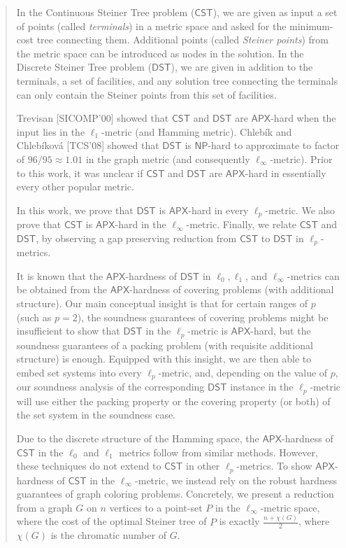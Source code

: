 \documentclass{article}\providecommand{\DeclareRedundantLanguages}[2]{}\usepackage[a4paper,margin=20mm]{geometry}
\newcommand{\1}{\textbf{1}}
\newcommand{\cst}{$\mathsf{CST}$\xspace}
\newcommand{\dst}{$\mathsf{DST}$\xspace}
\newcommand{\np}{$\mathsf{NP}$\xspace}
\newcommand{\apx}{$\mathsf{APX}$\xspace}
\begin{document}
\begin{abstract}
In the Continuous Steiner Tree problem (\cst), we are given as input a set of points (called \emph{terminals}) in a metric space and asked for the minimum-cost tree connecting them. Additional points (called \emph{Steiner points}) from the metric space can be introduced as nodes in the solution. In the Discrete Steiner Tree problem (\dst), we are given in addition to the terminals, a set of facilities, and any solution tree connecting the terminals can only contain the Steiner points from this set of facilities. %

Trevisan [SICOMP'00] showed that \cst and \dst are \apx-hard when the input lies in the $\ell_1$-metric (and Hamming metric). Chleb\'ik and Chleb\'ikov\'a [TCS'08] showed that \dst is \np-hard to approximate to factor of $96/95\approx 1.01$ in the graph metric (and consequently $\ell_\infty$-metric). Prior to this work, it was unclear if \cst and \dst are \apx-hard in essentially every other popular metric. %

In this work, we prove that \dst is \apx-hard in every $\ell_p$-metric. We also prove that \cst is \apx-hard in the $\ell_{\infty}$-metric. Finally, we relate \cst and \dst, by observing a gap preserving reduction from \cst to \dst in $\ell_p$-metrics. 


 
 It is known that the \apx-hardness of \dst in $\ell_0,\ell_1$, and $\ell_\infty$-metrics  can be obtained from the {\apx-hardness} of covering problems (with additional structure). 
Our main conceptual insight is that for certain ranges of $p$ (such as $p=2$), the soundness guarantees of covering problems might be insufficient to show that  \dst in the $\ell_p$-metric is \apx-hard, but the soundness guarantees of a packing problem (with requisite additional structure) is enough. Equipped with this insight, we are then able to embed set systems into every $\ell_p$-metric, and, depending on the value of $p$, our soundness analysis of the corresponding \dst instance in the $\ell_p$-metric will use either the packing property or the covering property (or both) of the set system in the soundness case.  %


Due to the discrete structure of the Hamming space, the \apx-hardness of \cst in the $\ell_0$ and $\ell_1$ metrics follow from similar methods. However, these techniques do not extend to \cst in other $\ell_p$-metrics. To show \apx-hardness of \cst in the $\ell_{\infty}$-metric, we instead rely on the robust hardness guarantees of graph coloring problems. Concretely, we present a reduction from a graph $G$ on $n$ vertices to a point-set $P$  in the $\ell_\infty$-metric space, where the cost of the optimal Steiner tree of $P$ is exactly $\frac{n+\chi(G)}{2}$, where $\chi(G)$ is the chromatic number of $G$. 
\end{abstract}
 
\end{document}
